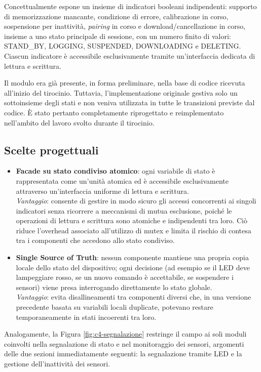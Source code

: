 Concettualmente espone un insieme di indicatori booleani indipendenti: supporto di memorizzazione mancante, condizione di errore, calibrazione in corso,
sospensione per inattività, \textit{pairing} in corso e download/cancellazione in corso, insieme a uno stato principale di sessione, con un numero
finito di valori: STAND\_BY, LOGGING, SUSPENDED, DOWNLOADING e DELETING. Ciascun indicatore è accessibile esclusivamente tramite un'interfaccia dedicata
di lettura e scrittura.

Il modulo era già presente, in forma preliminare, nella base di codice ricevuta all'inizio del tirocinio. Tuttavia, l'implementazione originale gestiva solo 
un sottoinsieme degli stati e non veniva utilizzata in tutte le transizioni previste dal codice. È stato pertanto completamente riprogettato e reimplementato 
nell'ambito del lavoro svolto durante il tirocinio.

\subsection{Scelte progettuali}

\begin{itemize}
    \item \textbf{Facade su stato condiviso atomico}: ogni variabile di stato è rappresentata come un'unità atomica ed è accessibile esclusivamente attraverso 
    un'interfaccia uniforme di lettura e scrittura. \\
    \textit{Vantaggio}: consente di gestire in modo sicuro gli accessi concorrenti ai singoli indicatori senza ricorrere a meccanismi di mutua esclusione, poiché 
    le operazioni di lettura e scrittura sono atomiche e indipendenti tra loro. Ciò riduce l'overhead associato all'utilizzo di mutex e limita il rischio di contesa
     tra i componenti che accedono allo stato condiviso.
    \item \textbf{Single Source of Truth}: nessun componente mantiene una propria copia locale dello stato del dispositivo; ogni decisione (ad esempio
    se il LED deve lampeggiare rosso, se un nuovo comando è accettabile, se sospendere i sensori) viene presa interrogando direttamente lo stato
    globale. \\
    \textit{Vantaggio}: evita disallineamenti tra componenti diversi che, in una versione precedente basata su variabili locali duplicate,
    potevano restare temporaneamente in stati incoerenti tra loro.
\end{itemize}

\newpage
Analogamente, la Figura \ref{fig:c4-segnalazione} restringe il campo ai soli moduli coinvolti nella segnalazione di stato e nel monitoraggio dei sensori, argomenti delle due 
sezioni immediatamente seguenti: la segnalazione tramite LED e la gestione dell'inattività dei sensori.

